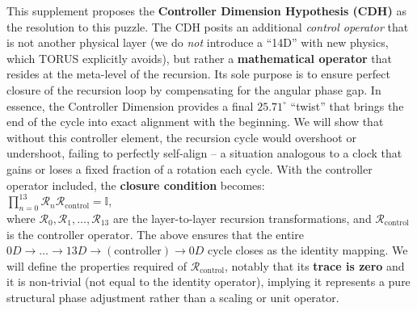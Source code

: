 \documentclass[]{article}
\begin{document}
This supplement proposes the \textbf{Controller Dimension Hypothesis
(CDH)} as the resolution to this puzzle. The CDH posits an additional
\emph{control operator} that is not another physical layer (we do
\emph{not} introduce a ``14D'' with new physics, which TORUS explicitly
avoids​), but rather a \textbf{mathematical operator} that resides at
the meta-level of the recursion. Its sole purpose is to ensure perfect
closure of the recursion loop by compensating for the angular phase gap.
In essence, the Controller Dimension provides a final
$25.71^\circ$ ``twist'' that brings
the end of the cycle into exact alignment with the beginning. We will
show that without this controller element, the recursion cycle would
overshoot or undershoot, failing to perfectly self-align -- a situation
analogous to a clock that gains or loses a fixed fraction of a rotation
each cycle. With the controller operator included, the \textbf{closure
condition} becomes:\\
$\prod_{n=0}^{13} \mathcal{R}_n \mathcal{R}_{\text{control}} = \mathbb{I}$,\\
where $\mathcal{R}_0, \mathcal{R}_1, \ldots, \mathcal{R}_{13}$ are the
layer-to-layer recursion transformations, and
$\mathcal{R}_{\text{control}}$ is the controller operator. The above ensures that the entire
$0D \to \ldots \to 13D \to (\text{controller}) \to 0D$ cycle closes as the identity mapping. We
will define the properties required of
$\mathcal{R}_{\text{control}}$,
notably that its \textbf{trace is zero} and it is non-trivial (not equal
to the identity operator), implying it represents a pure structural
phase adjustment rather than a scaling or unit operator.
\end{document}
